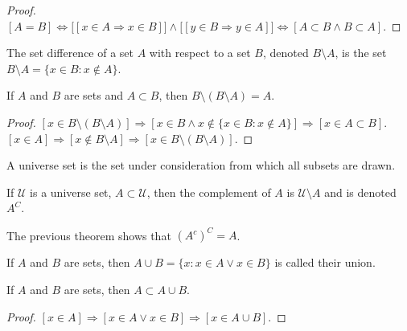 \documentclass[crop=false,class=book,oneside]{standalone}
\begin{document}
            \begin{proof}
                $[A=B]\Leftrightarrow%
                 \big[[x\in{A}\Rightarrow{x}\in{B}]\big]%
                 \land\big[[y\in{B}\Rightarrow{y}\in{A}]\big]%
                 \Leftrightarrow[A\subset{B}\land{B}\subset{A}]$. 
            \end{proof}
            \begin{definition}
                The set difference of a set $A$ with respect
                to a set $B$, denoted $B\setminus{A}$, is the set
                $B\setminus{A}=\{x\in{B}:x\notin{A}\}$.
            \end{definition}
            \begin{theorem}
                If $A$ and $B$ are sets and $A\subset B$,
                then $B\setminus(B\setminus A)=A$.
            \end{theorem}
            \begin{proof}
                $[x\in B\setminus(B\setminus{A})]%
                 \Rightarrow[x\in{B}\land{x}\notin%
                 \{x\in{B}:x\notin{A}\}]%
                 \Rightarrow[x\in{A}\subset{B}]$.
                 $[x\in{A}]\Rightarrow[x\notin{B}\setminus{A}]%
                 \Rightarrow[x\in{B}\setminus(B\setminus{A})]$.
            \end{proof}
            A universe set is the set under consideration
            from which all subsets are drawn.
            \begin{definition}
                If $\mathcal{U}$ is a universe set,
                $A\subset\mathcal{U}$, then the complement of
                $A$ is $\mathcal{U}\setminus{A}$ and is
                denoted $A^{C}$.
            \end{definition}
            The previous theorem shows that $(A^c)^{C}=A$.
            \begin{definition}
                If $A$ and $B$ are sets, then
                $A\cup{B}=\{x: x\in A \lor x\in B\}$
                is called their union.
            \end{definition}
            \begin{corollary}
                If $A$ and $B$ are sets, then $A\subset{A}\cup{B}$.
            \end{corollary}
            \begin{proof}
                $[x\in A]\Rightarrow[x\in A\lor x\in B]%
                 \Rightarrow[x\in{A}\cup{B}]$.
            \end{proof}
\end{document}
